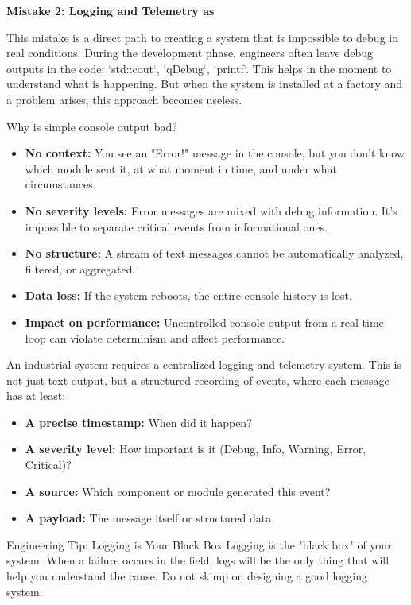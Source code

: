 \textbf{Mistake 2: Logging and Telemetry as }

This mistake is a direct path to creating a system that is impossible to debug in real conditions. During the development phase, engineers often leave debug outputs in the code: `std::cout`, `qDebug`, `printf`. This helps in the moment to understand what is happening. But when the system is installed at a factory and a problem arises, this approach becomes useless.

Why is simple console output bad?
\begin{itemize}
    \item \textbf{No context:} You see an "Error!" message in the console, but you don't know which module sent it, at what moment in time, and under what circumstances.
    \item \textbf{No severity levels:} Error messages are mixed with debug information. It's impossible to separate critical events from informational ones.
    \item \textbf{No structure:} A stream of text messages cannot be automatically analyzed, filtered, or aggregated.
    \item \textbf{Data loss:} If the system reboots, the entire console history is lost.
    \item \textbf{Impact on performance:} Uncontrolled console output from a real-time loop can violate determinism and affect performance.
\end{itemize}

An industrial system requires a centralized logging and telemetry system. This is not just text output, but a structured recording of events, where each message has at least:
\begin{itemize}
    \item \textbf{A precise timestamp:} When did it happen?
    \item \textbf{A severity level:} How important is it (Debug, Info, Warning, Error, Critical)?
    \item \textbf{A source:} Which component or module generated this event?
    \item \textbf{A payload:} The message itself or structured data.
\end{itemize}

\begin{tipbox}{Engineering Tip: Logging is Your Black Box}
Logging is the "black box" of your system. When a failure occurs in the field, logs will be the only thing that will help you understand the cause. Do not skimp on designing a good logging system.
\end{tipbox}


